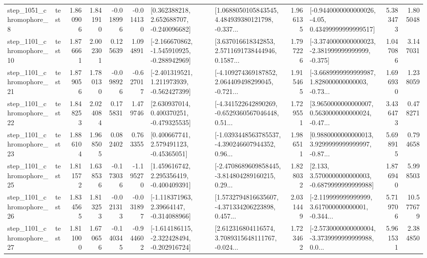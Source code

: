 \begin{tabular}{llrrrrllrlrr}
  step\_1051\_chromophore\_8 &      test &      1.860906 &    1.841910 &     -0.018996 & -0.014130 &    [0.362388218, 2.652688707, -0.240096682] &  [1.0688050105843545, 4.484939380121798, -0.337... &       1.966135 &  [-0.9440000000000026, -4.05, 0.43499999999999517] &            5.383473 &          1.805048 \\
 step\_1101\_chromophore\_10 &      test &      1.876661 &    2.002301 &      0.125639 &  1.094891 &  [-2.166670862, -1.545910925, -0.288942969] &  [3.637016618342853, 2.5711691738444946, 0.1587... &       1.797226 &  [-3.3740000000000023, -2.381999999999999, -0.375] &            1.047086 &          3.147031 \\
 step\_1101\_chromophore\_21 &      test &      1.879056 &    1.780130 &     -0.098926 & -0.627017 &   [-2.401319521, 1.211973939, -0.562427399] &  [-4.109274369187852, 2.064409498299045, -0.721... &       1.915465 &  [-3.6689999999999987, 1.828000000000003, -0.73... &            1.696930 &          1.238059 \\
 step\_1101\_chromophore\_22 &      test &      1.848253 &    2.024084 &      0.175831 &  1.479746 &    [2.630937014, 0.400370251, -0.479325535] &  [-4.341522642890269, -0.6529360567046448, 0.51... &       1.729551 &  [3.9650000000000007, 0.5630000000000024, -0.47... &            3.436473 &          0.478271 \\
 step\_1101\_chromophore\_23 &      test &      1.886104 &    1.968505 &      0.082402 &  0.763355 &     [0.400667741, 2.579491123, -0.45365051] &  [-1.0393448563785537, -4.390246607944352, 0.96... &       1.986511 &  [0.9880000000000013, 3.9299999999999997, -0.87... &            5.698915 &          0.794658 \\
 step\_1101\_chromophore\_25 &      test &      1.811572 &    1.638536 &     -0.173036 & -1.195270 &    [1.459616742, 2.295356419, -0.400409391] &  [-2.4708689609858445, -3.814804289160215, 0.29... &       1.828032 &   [2.133, 3.5700000000000003, -0.6879999999999988] &            1.876940 &          5.998503 \\
 step\_1101\_chromophore\_26 &      test &      1.834565 &    1.813253 &     -0.021313 & -0.031897 &    [-1.118371963, 2.39664147, -0.314088966] &  [1.5732794816635607, -4.371334206223898, 0.457... &       2.031449 &  [-2.119999999999999, 3.617000000000001, -0.344... &            5.719706 &         10.577679 \\
 step\_1101\_chromophore\_27 &      test &      1.811000 &    1.670656 &     -0.140345 & -0.944602 &  [-1.614186115, -2.322428494, -0.202916724] &  [2.612316804116574, 3.7089315648111767, -0.024... &       1.723462 &  [-2.5730000000000004, -3.3739999999999988, 0.0... &            5.961531 &          2.384850 \\

\end{tabular}
